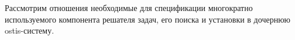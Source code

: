 \begin{SCn}
\end{SCn}

Рассмотрим отношения необходимые для спецификации многократно используемого компонента решателя задач, его поиска и установки в дочернюю ostis-систему.

